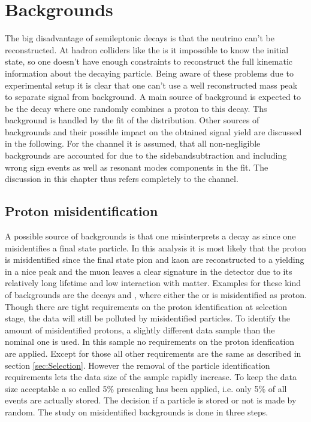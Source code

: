 \chapter{Backgrounds}
\label{sec:Backgrounds}

The big disadvantage of semileptonic decays is that the neutrino can't be reconstructed.
At hadron colliders like the \lhc is it impossible to know the initial state, so one doesn't have enough constraints to reconstruct the full kinematic information about the decaying particle.
Being aware of these problems due to experimental setup it is clear that one can't use a well reconstructed \Lb mass peak to separate signal from background.
A main source of background is expected to be the decay  where one randomly combines a proton to this decay.
Ths background is handled by the fit of the \logIP distribution.
Other sources of backgrounds and their possible impact on the obtained signal yield \NDp are discussed in the following.
For the \LbToLcmunu channel it is assumed, that all non-negligible backgrounds are accounted for due to the sidebandsubtraction and including wrong sign events as well as resonant modes components in the fit.
The discussion in this chapter thus refers completely to the \LbToDpmunuX channel.

\section{Proton misidentification}
A possible source of backgrounds is that one misinterprets a decay as \LbToDpmunuX since one misidentifies a final state particle.
In this analysis it is most likely that the proton is misidentified since the final state pion and kaon are reconstructed to a \Dz yielding in a nice peak and the muon leaves a clear signature in the detector due to its relatively long lifetime and low interaction with matter.
Examples for these kind of backgrounds are the decays  and , where either the \Kp or \pip is misidentified as proton.
Though there are tight requirements on the proton identification at selection stage, the data will still be polluted by misidentified particles.
To identify the amount of misidentified protons, a slightly different data sample than the nominal one is used. 
In this sample no requirements on the proton idenfication are applied.
Except for those all other requirements are the same as described in section \ref{sec:Selection}.
However the removal of the particle identification requirements lets the data size of the sample rapidly increase.
To keep the data size acceptable a so called 5\% prescaling has been applied, i.e. only 5\% of all events are actually stored.
The decision if a particle is stored or not is made by random.
The study on misidentified backgrounds is done in three steps.

